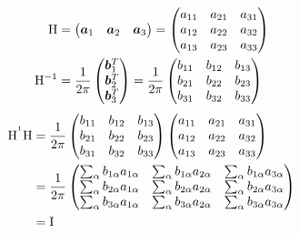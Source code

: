 \documentclass[11pt,a4paper,uplatex]{jsarticle}
\begin{document}
\begin{align}
{\rm H} &= \begin{pmatrix} \bm{a}_{1} & \bm{a}_{2} & \bm{a}_{3} \end{pmatrix} 
    = \begin{pmatrix} 
        a_{11} & a_{21} & a_{31} \\
        a_{12} & a_{22} & a_{32} \\
        a_{13} & a_{23} & a_{33} \\
    \end{pmatrix} \\
{\rm H}^{-1} &= \frac{1}{2\pi} \begin{pmatrix} \bm{b}_{1}^{T} \\ \bm{b}_{2}^{T} \\ \bm{b}_{3}^{T} \end{pmatrix} 
    = \frac{1}{2\pi}\begin{pmatrix} 
        b_{11} & b_{12} & b_{13} \\
        b_{21} & b_{22} & b_{23} \\
        b_{31} & b_{32} & b_{33} \\
    \end{pmatrix} \\
\end{align}
\begin{align}
    {\rm H^{^1} H} &=\frac{1}{2\pi} 
    \begin{pmatrix} 
        b_{11} & b_{12} & b_{13} \\
        b_{21} & b_{22} & b_{23} \\
        b_{31} & b_{32} & b_{33} \\
    \end{pmatrix} 
    \begin{pmatrix} 
        a_{11} & a_{21} & a_{31} \\
        a_{12} & a_{22} & a_{32} \\
        a_{13} & a_{23} & a_{33} \\
    \end{pmatrix} \\
    &=\frac{1}{2\pi} 
    \begin{pmatrix} 
        \sum_{\alpha} b_{1 \alpha} a_{1 \alpha} & \sum_{\alpha} b_{1 \alpha} a_{2 \alpha}  & \sum_{\alpha} b_{1 \alpha} a_{3 \alpha}  \\
        \sum_{\alpha} b_{2 \alpha} a_{1 \alpha} & \sum_{\alpha} b_{2 \alpha} a_{2 \alpha}  & \sum_{\alpha} b_{2 \alpha} a_{3 \alpha}  \\
        \sum_{\alpha} b_{3 \alpha} a_{1 \alpha} & \sum_{\alpha} b_{3 \alpha} a_{2 \alpha}  & \sum_{\alpha} b_{3 \alpha} a_{3 \alpha}  \\
    \end{pmatrix}\\ 
    &= {\rm I}
\end{align}
\end{document}
